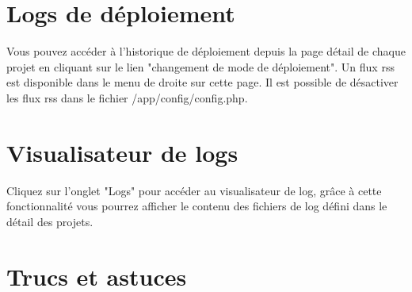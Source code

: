 \documentclass[12pt,a4paper]{report}
\begin{document}
\section{Logs de déploiement}
Vous pouvez accéder à l'historique de déploiement depuis la page détail de chaque projet en cliquant sur le lien "changement de mode de déploiement". Un flux rss est disponible dans le menu de droite sur cette page. Il est possible de désactiver les flux rss dans le fichier /app/config/config.php.

\section{Visualisateur de logs}
Cliquez sur l'onglet "Logs" pour accéder au visualisateur de log, grâce à cette fonctionnalité vous pourrez afficher le contenu des fichiers de log défini dans le détail des projets.

\section{Trucs et astuces}
\end{document}
